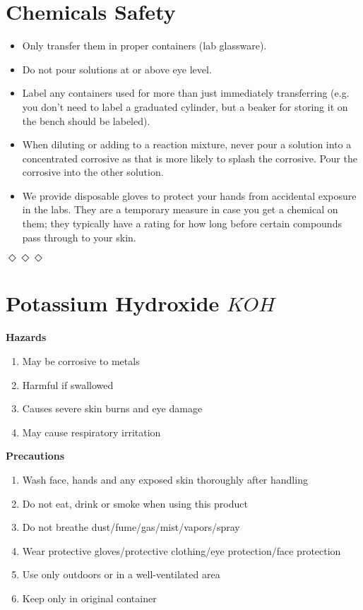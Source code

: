 \documentclass{report}
\begin{document}
\section*{Chemicals Safety}
{
	\begin{itemize}
		\item Only transfer them in proper containers (lab glassware).
		\item Do not pour solutions at or above eye level.
		\item Label any containers used for more than just immediately transferring (e.g. you don't need to label a graduated cylinder, but a beaker for storing it on the bench should be labeled).
		\item When diluting or adding to a reaction mixture, never pour a solution into a concentrated corrosive as that is more likely to splash the corrosive. Pour the corrosive into the other solution.
		\item We provide disposable gloves to protect your hands from accidental exposure in the labs. They are a temporary measure in case you get a chemical on them; they typically have a rating for how long before certain compounds pass through to your skin.
	\end{itemize}
}

\bigskip
\centerline{$\Diamond\Diamond\Diamond$} %
\bigskip

\section*{Potassium Hydroxide $KOH$}{
	\textbf{Hazards}
	\begin{enumerate}
		\item May be corrosive to metals
		\item Harmful if swallowed
		\item Causes severe skin burns and eye damage
		\item May cause respiratory irritation
	\end{enumerate}
	\textbf{Precautions}
	\begin{enumerate}
		\item Wash face, hands and any exposed skin thoroughly after handling
		\item Do not eat, drink or smoke when using this product
		\item Do not breathe dust/fume/gas/mist/vapors/spray
		\item Wear protective gloves/protective clothing/eye protection/face protection
		\item Use only outdoors or in a well-ventilated area
		\item Keep only in original container
	\end{enumerate}

}
\end{document}
